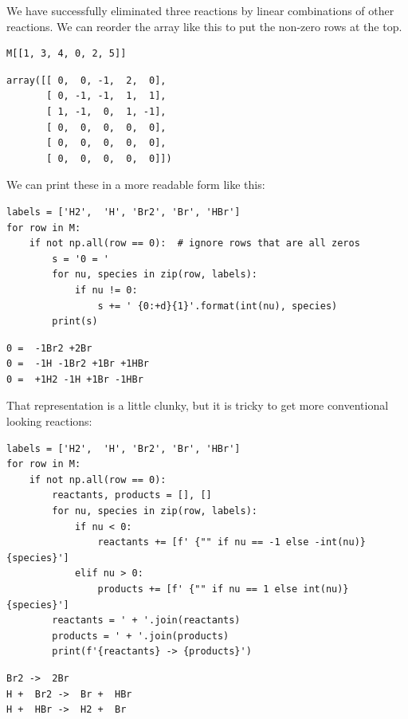 \documentclass[11pt]{article}
\begin{document}
We have successfully eliminated three reactions by linear combinations of other reactions. We can reorder the array like this to put the non-zero rows at the top.

\begin{verbatim}
M[[1, 3, 4, 0, 2, 5]]
\end{verbatim}

\begin{verbatim}
array([[ 0,  0, -1,  2,  0],
       [ 0, -1, -1,  1,  1],
       [ 1, -1,  0,  1, -1],
       [ 0,  0,  0,  0,  0],
       [ 0,  0,  0,  0,  0],
       [ 0,  0,  0,  0,  0]])
\end{verbatim}

We can print these in a more readable form like this:

\begin{verbatim}
labels = ['H2',  'H', 'Br2', 'Br', 'HBr']
for row in M:
    if not np.all(row == 0):  # ignore rows that are all zeros
        s = '0 = '
        for nu, species in zip(row, labels):
            if nu != 0:
                s += ' {0:+d}{1}'.format(int(nu), species)
        print(s)
\end{verbatim}

\begin{verbatim}
0 =  -1Br2 +2Br
0 =  -1H -1Br2 +1Br +1HBr
0 =  +1H2 -1H +1Br -1HBr

\end{verbatim}

That representation is a little clunky, but it is tricky to get more conventional looking reactions:

\begin{verbatim}
labels = ['H2',  'H', 'Br2', 'Br', 'HBr']
for row in M:
    if not np.all(row == 0):
        reactants, products = [], []
        for nu, species in zip(row, labels):
            if nu < 0:
                reactants += [f' {"" if nu == -1 else -int(nu)}{species}']
            elif nu > 0:
                products += [f' {"" if nu == 1 else int(nu)}{species}']
        reactants = ' + '.join(reactants)
        products = ' + '.join(products)
        print(f'{reactants} -> {products}')
\end{verbatim}

\begin{verbatim}
Br2 ->  2Br
H +  Br2 ->  Br +  HBr
H +  HBr ->  H2 +  Br

\end{verbatim}
\end{document}
